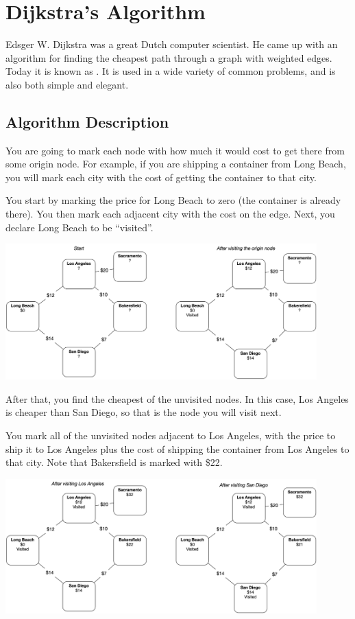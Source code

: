 \chapter{Dijkstra's Algorithm}

Edsger W. Dijkstra was a great Dutch computer scientist. He came up
with an algorithm for finding the cheapest path through a graph with
weighted edges. Today it is known as . It is used in a wide variety of common problems, and is
also both simple and elegant. 

\section{Algorithm Description}

You are going to mark each node with how much it would cost to get
there from some origin node.  For example, if you are shipping a
container from Long Beach, you will mark each city with the cost of
getting the container to that city.

You start by marking the price for Long Beach to zero (the container is already there). You then mark each adjacent city with the cost on
the edge. Next, you declare Long Beach to be ``visited''.

\includegraphics[width=0.9\textwidth]{step1.png}

After that, you find the cheapest of the unvisited nodes.  In this case, Los
Angeles is cheaper than San Diego, so that is the node you will visit
next.

You mark all of the unvisited nodes adjacent to Los Angeles, with the
price to ship it to Los Angeles plus the cost of shipping the
container from Los Angeles to that city. Note that Bakersfield is
marked with \$22.

\includegraphics[width=0.9\textwidth]{step2.png}

